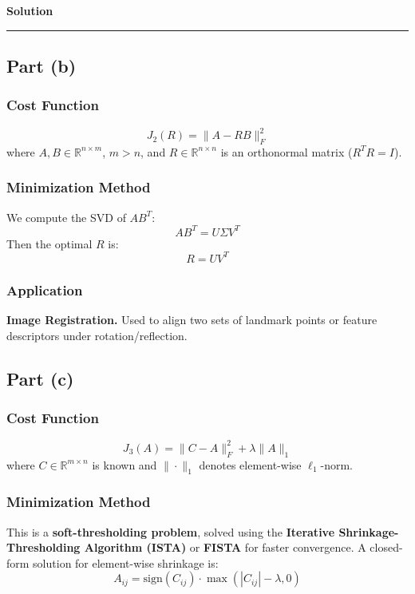 \documentclass[a4paper,12pt]{article}
\newenvironment{solution}[2][]{%
    \begin{mdframed}[linecolor=blue!70!black, linewidth=2pt, roundcorner=10pt, backgroundcolor=yellow!10!white, skipabove=12pt, skipbelow=12pt]%
        \textbf{\large #2}
        \par\noindent\rule{\textwidth}{0.4pt}
}{
    \end{mdframed}
}
\begin{document}
\begin{solution}{Solution}
\subsection{Part (b)}

\subsubsection{Cost Function}
\begin{equation}
J_2(R) = \|A - RB\|_F^2
\end{equation}
where \( A, B \in \mathbb{R}^{n \times m} \), \( m > n \), and \( R \in \mathbb{R}^{n \times n} \) is an orthonormal matrix (\( R^T R = I \)).

\subsubsection{Minimization Method}  
We compute the SVD of \( AB^T \):
\begin{equation}
AB^T = U \Sigma V^T
\end{equation}
Then the optimal \( R \) is:
\begin{equation}
R = UV^T
\end{equation}

\subsubsection{Application}  
\textbf{Image Registration.} Used to align two sets of landmark points or feature descriptors under rotation/reflection.

\subsection{Part (c)}

\subsubsection{Cost Function}
\begin{equation}
J_3(A) = \|C - A\|_F^2 + \lambda \|A\|_1
\end{equation}
where \( C \in \mathbb{R}^{m \times n} \) is known and \( \|\cdot\|_1 \) denotes element-wise \( \ell_1 \)-norm.

\subsubsection{Minimization Method}  
This is a \textbf{soft-thresholding problem}, solved using the \textbf{Iterative Shrinkage-Thresholding Algorithm (ISTA)} or \textbf{FISTA} for faster convergence. A closed-form solution for element-wise shrinkage is:
\begin{equation}
A_{ij} = \text{sign}(C_{ij}) \cdot \max(|C_{ij}| - \lambda, 0)
\end{equation}


\end{solution}
\end{document}

